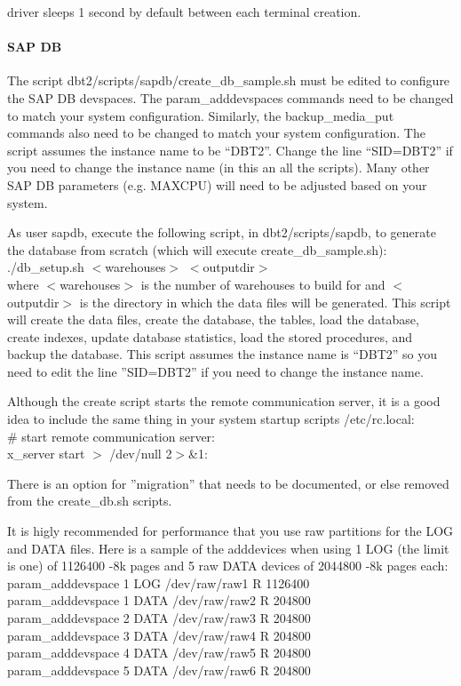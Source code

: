\documentclass{article}
\begin{document}
driver sleeps 1 second by default between each terminal creation.

\paragraph{SAP DB}

The script dbt2/scripts/sapdb/create\_db\_sample.sh must be edited to
configure the SAP DB devspaces.  The param\_adddevspaces commands need to be
changed to match your system configuration.  Similarly, the backup\_media\_put
commands also need to be changed to match your system configuration.  The
script assumes the instance name to be ``DBT2''.  Change the line ``SID=DBT2''
if you need to change the instance name (in this an all the scripts).  Many
other SAP DB parameters (e.g. MAXCPU) will need to be adjusted based on your
system.

\noindent
As user sapdb, execute the following script, in dbt2/scripts/sapdb, to
generate the database from scratch (which will execute
create\_db\_sample.sh): \\
\indent ./db\_setup.sh $<$warehouses$>$ $<$outputdir$>$ \\
where $<$warehouses$>$ is the number of warehouses to build for and
$<$outputdir$>$ is the directory in which the data files will be generated.
This script will create the data files, create the database, the tables, load
the database, create indexes, update database statistics, load the stored
procedures, and backup the database.  This script assumes the instance name is
``DBT2'' so you need to edit the line ''SID=DBT2'' if you need to change the
instance name.

\noindent
Although the create script starts the remote communication server, it is a
good idea to include the same thing in your system startup scripts
/etc/rc.local: \\
\indent \# start remote communication server: \\
\indent x\_server start $>$ /dev/null 2$>$\&1:

\noindent
There is an option for ''migration'' that needs to be documented, or else
removed from the create\_db.sh scripts.

\noindent
It is higly recommended for performance that you use raw partitions for the
LOG and DATA files.  Here is a sample of the adddevices when using 1 LOG (the
limit is one)  of 1126400 -8k pages and 5 raw DATA devices of 2044800 -8k
pages each: \\
\indent param\_adddevspace 1 LOG  /dev/raw/raw1 R 1126400 \\
\indent param\_adddevspace 1 DATA /dev/raw/raw2 R 204800 \\
\indent param\_adddevspace 2 DATA /dev/raw/raw3 R 204800 \\
\indent param\_adddevspace 3 DATA /dev/raw/raw4 R 204800 \\
\indent param\_adddevspace 4 DATA /dev/raw/raw5 R 204800 \\
\indent param\_adddevspace 5 DATA /dev/raw/raw6 R 204800
\end{document}
